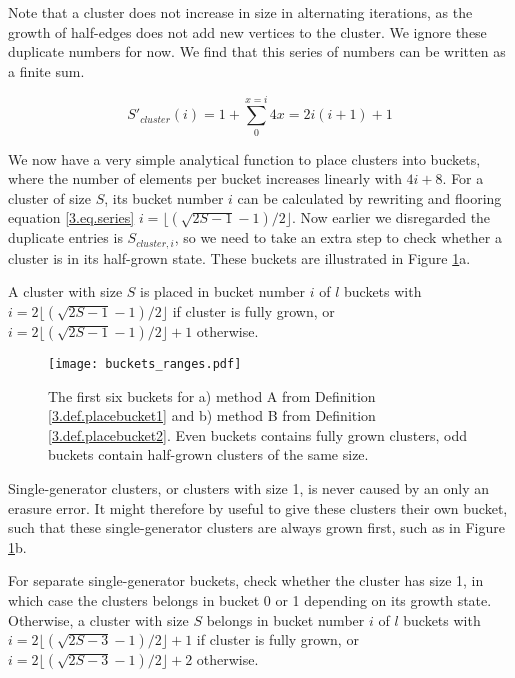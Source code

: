 Note that a cluster does not increase in size in alternating iterations, as the growth of half-edges does not add new vertices to the cluster. We ignore these duplicate numbers for now. We find that this series of numbers can be written as a finite sum.

\begin{equation}\label{3.eq.series}
  S'_{cluster}(i) = 1 + \sum_{0}^{x=i} 4x = 2i(i+1) + 1
\end{equation}

We now have a very simple analytical function to place clusters into buckets, where the number of elements per bucket increases linearly with $4i + 8$. For a cluster of size $S$, its bucket number $i$ can be calculated by rewriting and flooring equation \ref{3.eq.series} $i=\lfloor (\sqrt{2S-1} - 1)/2 \rfloor$. Now earlier we disregarded the duplicate entries is $S_{cluster, i}$, so we need to take an extra step to check whether a cluster is in its half-grown state. These buckets are illustrated in Figure \ref{3.fig.bucketsranges}a.

\begin{definition}\label{3.def.placebucket1}
  A cluster with size $S$ is placed in bucket number $i$ of $l$ buckets with $i=2\lfloor (\sqrt{2S-1} - 1)/2 \rfloor$ if cluster is fully grown, or $i=2\lfloor (\sqrt{2S-1} - 1)/2 \rfloor + 1$ otherwise.
\end{definition}

\begin{figure}[htbp]
  \centering
  \texttt{[image: buckets\_ranges.pdf]}
  \caption{The first six buckets for a) method A from Definition \ref{3.def.placebucket1} and b) method B from Definition \ref{3.def.placebucket2}. Even buckets contains fully grown clusters, odd buckets contain half-grown clusters of the same size.}\label{3.fig.bucketsranges}
\end{figure}

Single-generator clusters, or clusters with size 1, is never caused by an only an erasure error. It might therefore by useful to give these clusters their own bucket, such that these single-generator clusters are always grown first, such as in Figure \ref{3.fig.bucketsranges}b.

\begin{definition}\label{3.def.placebucket2}
  For separate single-generator buckets, check whether the cluster has size 1, in which case the clusters belongs in bucket 0 or 1 depending on its growth state. Otherwise, a cluster with size $S$ belongs in bucket number $i$ of $l$ buckets with $i=2\lfloor (\sqrt{2S-3} - 1)/2 \rfloor + 1$ if cluster is fully grown, or $i=2\lfloor (\sqrt{2S-3} - 1)/2 \rfloor + 2$ otherwise.
\end{definition}

